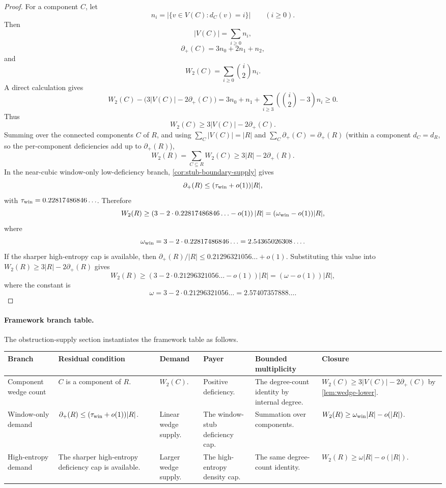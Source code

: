 \documentclass[11pt]{article}
\newcommand{\defp}{\partial_+}
\newcommand{\FrameworkBranchTableHeader}{%
\toprule
\textbf{Branch} & \textbf{Residual condition} & \textbf{Demand} & \textbf{Payer} & \textbf{Bounded multiplicity} & \textbf{Closure}\\
\midrule
}
\begin{document}
\begin{proof}
For a component $C$, let
\[
n_i=|\{v\in V(C):d_C(v)=i\}|\qquad(i\ge0).
\]
Then
\[
|V(C)|=\sum_{i\ge0}n_i,
\]
\[
\defp(C)=3n_0+2n_1+n_2,
\]
and
\[
W_2(C)=\sum_{i\ge0}\binom i2 n_i.
\]
A direct calculation gives
\[
W_2(C)-\bigl(3|V(C)|-2\defp(C)\bigr)
=3n_0+n_1+\sum_{i\ge3}\left(\binom i2-3\right)n_i\ge0.
\]
Thus
\[
W_2(C)\ge3|V(C)|-2\defp(C).
\]
Summing over the connected components $C$ of $R$, and using $\sum_C|V(C)|=|R|$ and $\sum_C\defp(C)=\defp(R)$ (within a component $d_C=d_R$, so the per-component deficiencies add up to $\defp(R)$),
\[
W_2(R)=\sum_{C\subseteq R}W_2(C)\ge 3|R|-2\defp(R).
\]
In the near-cubic window-only low-deficiency branch,
\cref{cor:stub-boundary-supply} gives
\[
\defp(R)\le(\tau_{\rm win}+o(1))|R|,
\]
with
$\tau_{\rm win}=0.22817486846\ldots$.  Therefore
\[
W_2(R)\ge
\left(3-2\cdot0.22817486846\ldots-o(1)\right)|R|
=(\omega_{\rm win}-o(1))|R|,
\]
where
\[
\omega_{\rm win}=3-2\cdot0.22817486846\ldots=2.54365026308\ldots .
\]
If the sharper high-entropy cap is available, then
$\defp(R)/|R|\le0.21296321056\ldots+o(1)$.  Substituting this value into
\(W_2(R)\ge3|R|-2\defp(R)\) gives
\[
W_2(R)\ge\left(3-2\cdot0.21296321056\ldots-o(1)\right)|R|=(\omega-o(1))|R|,
\]
where the constant is
\[
\omega=3-2\cdot0.21296321056\ldots=2.57407357888\ldots.
\]
\end{proof}

\paragraph{Framework branch table.}
The obstruction-supply section instantiates the framework table as follows.
\begin{longtable}{L{0.13\textwidth} L{0.19\textwidth} L{0.14\textwidth} L{0.14\textwidth} L{0.17\textwidth} L{0.17\textwidth}}
\FrameworkBranchTableHeader
Component wedge count
&
\(C\) is a component of \(R\).
&
\(W_2(C)\).
&
Positive deficiency.
&
The degree-count identity by internal degree.
&
\(W_2(C)\ge3|V(C)|-2\defp(C)\) by \cref{lem:wedge-lower}.
\\
\addlinespace
Window-only demand
&
\(\defp(R)\le(\tau_{\rm win}+o(1))|R|\).
&
Linear wedge supply.
&
The window-stub deficiency cap.
&
Summation over components.
&
\(W_2(R)\ge\omega_{\rm win}|R|-o(|R|)\).
\\
\addlinespace
High-entropy demand
&
The sharper high-entropy deficiency cap is available.
&
Larger wedge supply.
&
The high-entropy density cap.
&
The same degree-count identity.
&
\(W_2(R)\ge\omega|R|-o(|R|)\).
\\
\bottomrule
\end{longtable}
\end{document}
